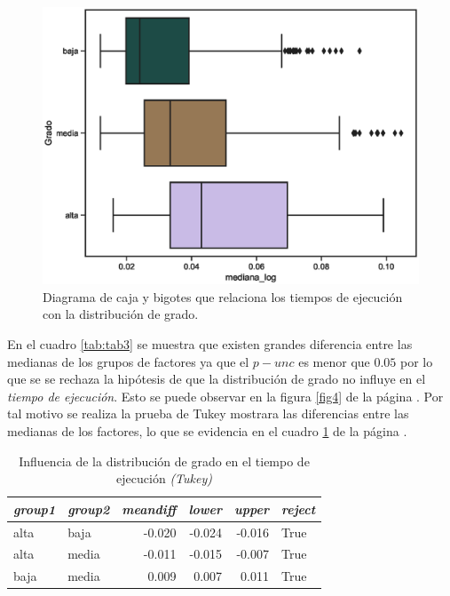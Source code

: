 \documentclass{article}
\begin{document}
\begin{center}
\begin{figure}[htbp]
\includegraphics[scale=0.6]{boxplot_Grado.eps}
\caption{Diagrama de caja y bigotes que relaciona los tiempos de ejecución con la distribución de grado.}
\label{fig13}
\end{figure}
\end{center}

En el cuadro \ref{tab:tab3} se muestra que existen grandes diferencia entre las medianas de los grupos de factores ya que el \textbf{$p-unc$} es menor que $0.05$ por lo que se se rechaza la hipótesis de que la distribución de grado no influye en el \textit{tiempo de ejecución}. Esto se puede observar en la figura \ref{fig4} de la página \pageref{fig4}. Por tal motivo se realiza la prueba de Tukey mostrara las diferencias entre las medianas de los factores, lo que se evidencia en el cuadro \ref{tab:t4} de la página \pageref{tab:t4}.
\begin{table}[htbp]
  \centering
  \caption{Influencia de la distribución de grado en el tiempo de ejecución \textit{(Tukey)}}
    \begin{tabular}{llrrrl}
    \toprule
    \textit{\textbf{group1}} & \textit{\textbf{group2}} & \multicolumn{1}{l}{\textit{\textbf{meandiff}}} & \multicolumn{1}{l}{\textit{\textbf{lower}}} & \multicolumn{1}{l}{\textit{\textbf{upper}}} & \textit{\textbf{reject}} \\
    \midrule
    alta  & baja  & -0.020 & -0.024 & -0.016 & True \\
    alta  & media & -0.011 & -0.015 & -0.007 & True \\
    baja  & media & 0.009 & 0.007 & 0.011 & True \\
    \bottomrule
    \end{tabular}%
  \label{tab:t4}%
\end{table}%
\end{document}

